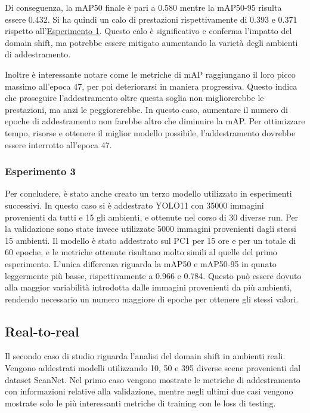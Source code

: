 \documentclass[12pt]{report}
\begin{document}
Di conseguenza, la mAP50 finale è pari a 0.580 mentre la mAP50-95 risulta essere 0.432. Si ha quindi un calo di prestazioni rispettivamente di 0.393 e 0.371 rispetto all'\hyperref[sec:esperimento_1]{Esperimento 1}. Questo calo è significativo e conferma l'impatto del domain shift, ma potrebbe essere mitigato aumentando la varietà degli ambienti di addestramento.

Inoltre è interessante notare come le metriche di mAP raggiungano il loro picco massimo all'epoca 47, per poi deteriorarsi in maniera progressiva. Questo indica che proseguire l'addestramento oltre questa soglia non migliorerebbe le prestazioni, ma anzi le peggiorerebbe.  In questo caso, aumentare il numero di epoche di addestramento non farebbe altro che diminuire la mAP. Per ottimizzare tempo, risorse e ottenere il miglior modello possibile, l'addestramento dovrebbe essere interrotto all'epoca 47.

\subsubsection{Esperimento 3}
\label{sec:esperimento_3}

Per concludere, è stato anche creato un terzo modello utilizzato in esperimenti successivi. In questo caso si è addestrato YOLO11 con 35000 immagini provenienti da tutti e 15 gli ambienti, e ottenute nel corso di 30 diverse run. Per la validazione sono state invece utilizzate 5000 immagini provenienti dagli stessi 15 ambienti. Il modello è stato addestrato sul PC1 per 15 ore e per un totale di 60 epoche, e le metriche ottenute risultano molto simili al quelle del primo esperimento. L'unica differenza riguarda la mAP50 e mAP50-95 in qunato leggermente più basse, rispettivamente a 0.966 e 0.784. Questo può essere dovuto alla maggior variabilità introdotta dalle immagini provenienti da più ambienti, rendendo necessario un numero maggiore di epoche per ottenere gli stessi valori.

\subsection{Real-to-real}
\label{sec:real_to_real}

Il secondo caso di studio riguarda l'analisi del domain shift in ambienti reali. Vengono addestrati modelli utilizzando 10, 50 e 395 diverse scene provenienti dal dataset ScanNet. Nel primo caso vengono mostrate le metriche di addestramento con informazioni relative alla validazione, mentre negli ultimi due casi vengono mostrate solo le più interessanti metriche di training con le loss di testing.
\end{document}
